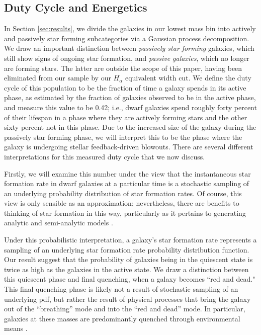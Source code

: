 \documentclass[iop]{emulateapj}
\begin{document}
\subsection{Duty Cycle and Energetics}

In Section \ref{sec:results}, we divide the galaxies in our lowest mass bin into actively and passively star forming subcategories via a Gaussian process decomposition. We draw an important distinction between \textit{passively star forming} galaxies, which still show signs of ongoing star formation, and \textit{passive galaxies}, which no longer are forming stars. The latter are outside the scope of this paper, having been eliminated from our sample by our $H_{\alpha}$ equivalent width cut. We define the duty cycle of this population to be the fraction of time a galaxy spends in its active phase, as estimated by the fraction of galaxies observed to be in the active phase, and measure this value to be 0.42; i.e., dwarf galaxies spend roughly forty percent of their lifespan in a phase where they are actively forming stars and the other sixty percent not in this phase. Due to the increased size of the galaxy during the passively star forming phase, we will interpret this to be the phase where the galaxy is undergoing stellar feedback-driven blowouts. There are several different interpretations for this measured duty cycle that we now discuss.

Firstly, we will examine this number under the view that the instantaneous star formation rate in dwarf galaxies at a particular time is a stochastic sampling of an underlying probability distribution of star formation rates. Of course, this view is only sensible as an approximation; nevertheless, there are benefits to thinking of star formation in this way, particularly as it pertains to generating analytic and semi-analytic models \citep{Kelson16}. 

Under this probabilistic interpretation, a galaxy's star formation rate represents a sampling of an underlying star formation rate probability distribution function. Our result suggest that the probability of galaxies being in the quiescent state is twice as high as the galaxies in the active state. We draw a distinction between this quiescent phase and final quenching, when a galaxy becomes ``red and dead." This final quenching phase is likely not a result of stochastic sampling of an underlying pdf, but rather the result of physical processes that bring the galaxy out of the ``breathing'' mode and into the ``red and dead'' mode. In particular, galaxies at these masses are predominantly quenched through environmental means \citep{Kauffmann03, geha12}.
\end{document}
